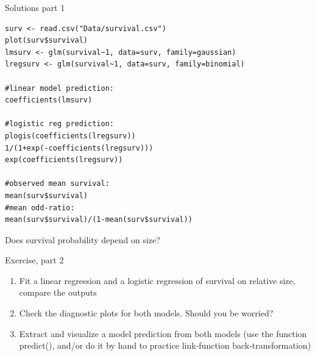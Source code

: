 \documentclass{beamer}
\makeatletter
\newenvironment{kframe}{%
 \def\at@end@of@kframe{}%
 \ifinner\ifhmode%
  \def\at@end@of@kframe{\end{minipage}}%
  \begin{minipage}{\columnwidth}%
 \fi\fi%
 \def\FrameCommand##1{\hskip\@totalleftmargin \hskip-\fboxsep
 \colorbox{shadecolor}{##1}\hskip-\fboxsep
     \hskip-\linewidth \hskip-\@totalleftmargin \hskip\columnwidth}%
 \MakeFramed {\advance\hsize-\width
   \@totalleftmargin\z@ \linewidth\hsize
   \@setminipage}}%
 {\par\unskip\endMakeFramed%
 \at@end@of@kframe}
\newenvironment{knitrout}{}{} %
\makeatother
\begin{document}
\begin{frame}[fragile]{Solutions part 1}
     
\begin{knitrout}
\color{fgcolor}\begin{kframe}
\small
\begin{verbatim}
surv <- read.csv("Data/survival.csv")
plot(surv$survival)
lmsurv <- glm(survival~1, data=surv, family=gaussian)
lregsurv <- glm(survival~1, data=surv, family=binomial)

#linear model prediction:
coefficients(lmsurv)

#logistic reg prediction:
plogis(coefficients(lregsurv))
1/(1+exp(-coefficients(lregsurv)))
exp(coefficients(lregsurv))

#observed mean survival:
mean(surv$survival)
#mean odd-ratio:
mean(surv$survival)/(1-mean(surv$survival))
\end{verbatim}
\end{kframe}
\end{knitrout}
\end{frame}


\begin{frame}{Does survival probability depend on size?}
 
  \begin{exampleblock}{Exercise, part 2}
    \begin{enumerate}
      \item Fit a linear regression and a logistic regression of survival on relative size, compare the outputs
      \item Check the diagnostic plots for both models. Should you be worried?
      \item Extract and visualize a model prediction from both models (use the function predict(), and/or do it by hand to practice link-function back-transformation)
    \end{enumerate}
  \end{exampleblock}
  
\end{frame}
\end{document}
